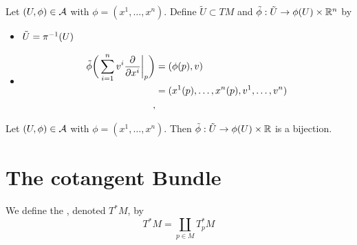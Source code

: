 \documentclass{book}
\begin{document}
	\begin{defn}
		Let $(U, \phi) \in \mathcal{A}$ with $\phi = (x^1, \dots, x^n)$. Define $\tilde{U} \subset TM$ and $\tilde{\phi}: \tilde{U} \rightarrow \phi(U) \times \mathbb{R}^{n}$ by  
		\begin{itemize}
			\item $\tilde{U} = \pi^{-1}(U)$
			\item 
			\begin{align*}
				\tilde{\phi} \bigg(\sum\limits_{i =1}^n v^i \frac{\partial}{\partial x^i} \bigg|_p \bigg) 
				& = (\phi(p), v) \\
				& = (x^1(p), \dots, x^n(p), v^1, \dots, v^n) \\
, 			\end{align*}
		\end{itemize}
	\end{defn}

	\begin{ex}
		Let $(U, \phi) \in \mathcal{A}$ with $\phi = (x^1, \dots, x^n)$. Then $\tilde{\phi}:\tilde{U} \rightarrow \phi(U) \times \mathbb{R}$ is a bijection. 
	\end{ex}





























	\newpage
	\section{The cotangent Bundle}
	
	\begin{defn}
		We define the , denoted $T^*M$, by 
		$$T^*M = \coprod_{p \in M} T_p^*M$$ 
	\end{defn}













	
	
	
	
	
	
\end{document}
